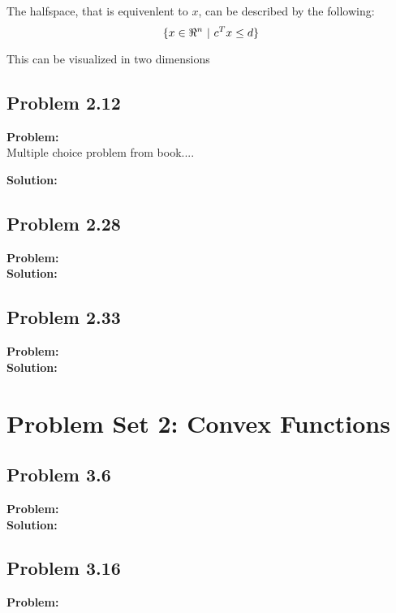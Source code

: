 \documentclass[letter]{article}
\begin{document}
The halfspace, that is equivenlent to $x$, can be described by the following:
\begin{equation}
	\{x\in \real^n \ | \ c^T x \leq d\}
\end{equation}

This can be visualized in two dimensions 


\subsection{Problem 2.12}
\textbf{Problem:}\\
Multiple choice problem from book....


\textbf{Solution:}\\



\subsection{Problem 2.28}
\textbf{Problem:}\\



\textbf{Solution:}\\




\subsection{Problem 2.33}
\textbf{Problem:}\\



\textbf{Solution:}\\





\section{Problem Set 2: Convex Functions}

\subsection{Problem 3.6}
\textbf{Problem:}\\



\textbf{Solution:}\\


\subsection{Problem 3.16}
\textbf{Problem:}\\
\end{document}
